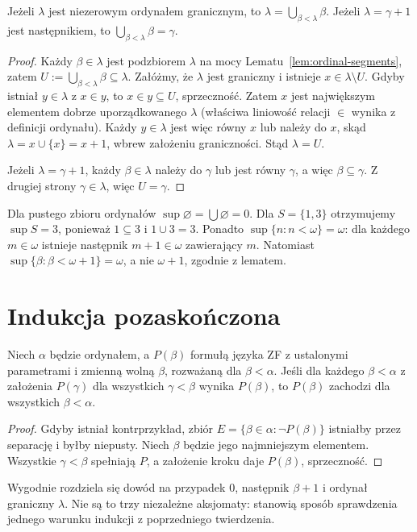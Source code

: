 \begin{lemat}
\label{lem:ordinal-limit-union}
Jeżeli $\lambda$ jest niezerowym ordynałem granicznym, to
$\lambda=\bigcup_{\beta<\lambda}\beta$.
Jeżeli $\lambda=\gamma+1$ jest następnikiem, to
$\bigcup_{\beta<\lambda}\beta=\gamma$.
\end{lemat}
\begin{proof}
Każdy $\beta\in\lambda$ jest podzbiorem $\lambda$
na mocy Lematu~\ref{lem:ordinal-segments},
zatem $U:=\bigcup_{\beta<\lambda}\beta\subseteq\lambda$.
Załóżmy, że $\lambda$ jest graniczny i
istnieje $x\in\lambda\setminus U$.
Gdyby istniał $y\in\lambda$ z $x\in y$,
to $x\in y\subseteq U$, sprzeczność.
Zatem $x$ jest największym elementem
dobrze uporządkowanego $\lambda$
(właściwa liniowość relacji $\in$ wynika
z definicji ordynału).
Każdy $y\in\lambda$ jest więc równy $x$
lub należy do $x$, skąd
$\lambda=x\cup\{x\}=x+1$,
wbrew założeniu graniczności.
Stąd $\lambda=U$.

Jeżeli $\lambda=\gamma+1$, każdy $\beta\in\lambda$
należy do $\gamma$ lub jest równy $\gamma$,
a więc $\beta\subseteq\gamma$.
Z drugiej strony $\gamma\in\lambda$,
więc $U=\gamma$.
\end{proof}
\begin{przyklad}
\label{ex:ordinal-suprema}
Dla pustego zbioru ordynałów
$\sup\varnothing=\bigcup\varnothing=0$.
Dla $S=\{1,3\}$ otrzymujemy $\sup S=3$,
ponieważ $1\subseteq3$ i $1\cup3=3$.
Ponadto $\sup\{n:n<\omega\}=\omega$:
dla każdego $m\in\omega$ istnieje
następnik $m+1\in\omega$ zawierający $m$.
Natomiast
$\sup\{\beta:\beta<\omega+1\}=\omega$,
a nie $\omega+1$, zgodnie z lematem.
\end{przyklad}

\section{Indukcja pozaskończona}
\begin{twierdzenie}\label{thm:ordinal-induction}
Niech $\alpha$ będzie ordynałem, a $P(\beta)$
formułą języka ZF z ustalonymi parametrami
i zmienną wolną $\beta$, rozważaną dla $\beta<\alpha$. Jeśli dla każdego $\beta<\alpha$ z założenia $P(\gamma)$ dla wszystkich $\gamma<\beta$ wynika $P(\beta)$, to $P(\beta)$ zachodzi dla wszystkich $\beta<\alpha$.
\end{twierdzenie}
\begin{proof}
Gdyby istniał kontrprzykład, zbiór
$E=\{\beta\in\alpha:\neg P(\beta)\}$
istniałby przez separację i byłby niepusty. Niech $\beta$ będzie jego najmniejszym elementem. Wszystkie $\gamma<\beta$ spełniają $P$, a założenie kroku daje $P(\beta)$, sprzeczność.
\end{proof}
\begin{uwaga}
Wygodnie rozdziela się dowód na przypadek $0$, następnik $\beta+1$ i ordynał graniczny $\lambda$. Nie są to trzy niezależne aksjomaty: stanowią sposób sprawdzenia jednego warunku indukcji z poprzedniego twierdzenia.
\end{uwaga}

